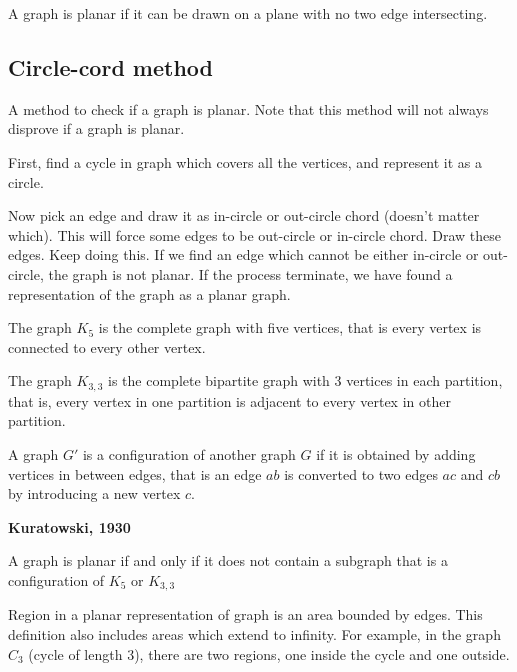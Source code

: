 \documentclass[10pt]{article}
\begin{document}
\begin{definition}
    A graph is planar if it can be drawn on a plane with no two edge intersecting.
\end{definition}

\subsection{Circle-cord method}

A method to check if a graph is planar. Note that this method will not always disprove if a graph is planar.

First, find a cycle in graph which covers all the vertices, and represent it as a circle.

Now pick an edge and draw it as in-circle or out-circle chord (doesn't matter which). This will force some edges to be out-circle or in-circle chord. Draw these edges. Keep doing this. If we find an edge which cannot be either in-circle or out-circle, the graph is not planar. If the process terminate, we have found a representation of the graph as a planar graph.

\begin{definition}
    The graph $K_5$ is the complete graph with five vertices, that is every vertex is connected to every other vertex.

    \vspace{1em}

    The graph $K_{3,3}$ is the complete bipartite graph with 3 vertices in each partition, that is, every vertex in one partition is adjacent to every vertex in other partition.

    \vspace{1em}

    A graph $G'$ is a configuration of another graph $G$ if it is obtained by adding vertices in between edges, that is an edge $ab$ is converted to two edges $ac$ and $cb$ by introducing a new vertex $c$.
\end{definition}

\begin{theorem}
    \textbf{Kuratowski, 1930}

    A graph is planar if and only if it does not contain a subgraph that is a configuration of $K_5$ or $K_{3,3}$
\end{theorem}

\begin{definition}
    Region in a planar representation of graph is an area bounded by edges. This definition also includes areas which extend to infinity. For example, in the graph $C_3$ (cycle of length 3), there are two regions, one inside the cycle and one outside.
\end{definition}
\end{document}
